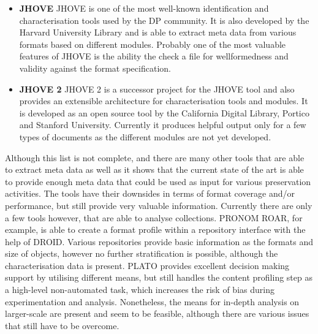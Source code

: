 \begin{itemize}
\item \textbf{JHOVE}\newline
JHOVE is one of the most well-known identification and characterisation tools used by the DP community. It is also developed by the Harvard University Library and is able to extract meta data from various formats based on different modules. Probably one of the most valuable features of JHOVE is the ability the check a file for wellformedness and validity against the format specification.

\item \textbf{JHOVE 2}\newline
JHOVE 2 is a successor project for the JHOVE tool and also provides an extensible architecture for characterisation tools and modules. It is developed as an open source tool by the California Digital Library, Portico and Stanford University. Currently it produces helpful output only for a few types of documents as the different modules are not yet developed.

\end{itemize}

Although this list is not complete, and there are many other tools that are able to extract meta data as well as it shows that the current state of the art is able to provide enough meta data that could be used as input for various preservation activities. The tools have their downsides in terms of format coverage and/or performance, but still provide very valuable information.
Currently there are only a few tools however, that are able to analyse collections. PRONOM ROAR, for example, is able to create a format profile within a repository interface with the help of DROID.
Various repositories provide basic information as the formats and size of objects, however no further stratification is possible, although the characterisation data is present.
PLATO provides excellent decision making support by utilising different means, but still handles the content profiling step as a high-level non-automated task, which increases the risk of bias during experimentation and analysis.
Nonetheless, the means for in-depth analysis on larger-scale are present and seem to be feasible, although there are various issues that still have to be overcome.

